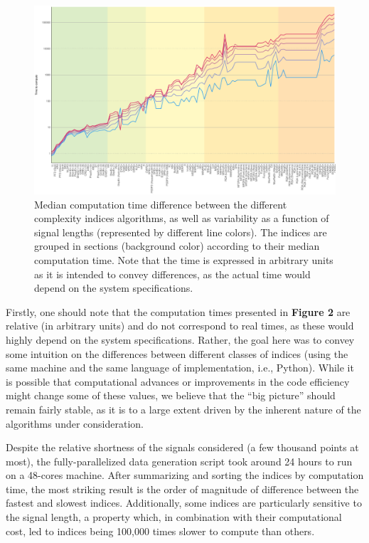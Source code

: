 \documentclass[
  man]{apa6}
\begin{document}
\begin{figure}
\centering
\includegraphics{./figures/time-1.pdf}
\caption{\label{fig:time}Median computation time difference between the different complexity indices algorithms, as well as variability as a function of signal lengths (represented by different line colors). The indices are grouped in sections (background color) according to their median computation time. Note that the time is expressed in arbitrary units as it is intended to convey differences, as the actual time would depend on the system specifications.}
\end{figure}

Firstly, one should note that the computation times presented in \textbf{Figure 2} are relative (in arbitrary units) and do not correspond to real times, as these would highly depend on the system specifications. Rather, the goal here was to convey some intuition on the differences between different classes of indices (using the same machine and the same language of implementation, i.e., Python). While it is possible that computational advances or improvements in the code efficiency might change some of these values, we believe that the ``big picture'' should remain fairly stable, as it is to a large extent driven by the inherent nature of the algorithms under consideration.

Despite the relative shortness of the signals considered (a few thousand points at most), the fully-parallelized data generation script took around 24 hours to run on a 48-cores machine. After summarizing and sorting the indices by computation time, the most striking result is the order of magnitude of difference between the fastest and slowest indices. Additionally, some indices are particularly sensitive to the signal length, a property which, in combination with their computational cost, led to indices being 100,000 times slower to compute than others.
\end{document}
